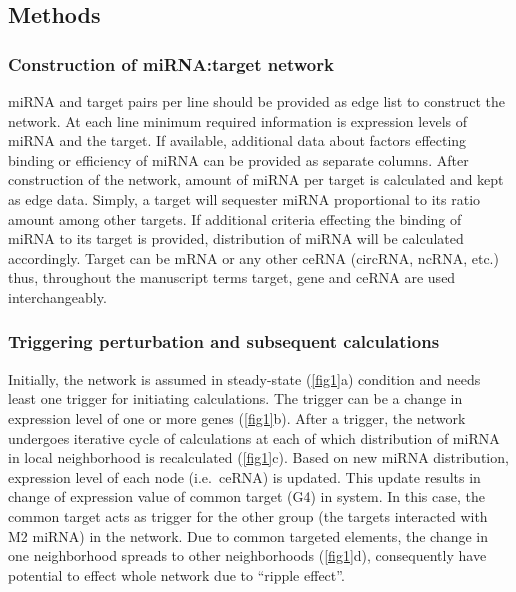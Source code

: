 \documentclass[]{article}
\begin{document}
\hypertarget{methods}{%
\subsection{Methods}\label{methods}}

\hypertarget{construction-of-mirnatarget-network}{%
\subsubsection{Construction of miRNA:target
network}\label{construction-of-mirnatarget-network}}

miRNA and target pairs per line should be provided as edge list to
construct the network. At each line minimum required information is
expression levels of miRNA and the target. If available, additional data
about factors effecting binding or efficiency of miRNA can be provided
as separate columns. After construction of the network, amount of miRNA
per target is calculated and kept as edge data. Simply, a target will
sequester miRNA proportional to its ratio amount among other targets. If
additional criteria effecting the binding of miRNA to its target is
provided, distribution of miRNA will be calculated accordingly. Target
can be mRNA or any other ceRNA (circRNA, ncRNA, etc.) thus, throughout
the manuscript terms target, gene and ceRNA are used interchangeably.

\hypertarget{triggering-perturbation-and-subsequent-calculations}{%
\subsubsection{Triggering perturbation and subsequent
calculations}\label{triggering-perturbation-and-subsequent-calculations}}

Initially, the network is assumed in steady-state (\autoref{fig1}a)
condition and needs least one trigger for initiating calculations. The
trigger can be a change in expression level of one or more genes
(\autoref{fig1}b). After a trigger, the network undergoes iterative
cycle of calculations at each of which distribution of miRNA in local
neighborhood is recalculated (\autoref{fig1}c). Based on new miRNA
distribution, expression level of each node (i.e.~ceRNA) is updated.
This update results in change of expression value of common target (G4)
in system. In this case, the common target acts as trigger for the other
group (the targets interacted with M2 miRNA) in the network. Due to
common targeted elements, the change in one neighborhood spreads to
other neighborhoods (\autoref{fig1}d), consequently have potential to
effect whole network due to ``ripple effect''.
\end{document}
